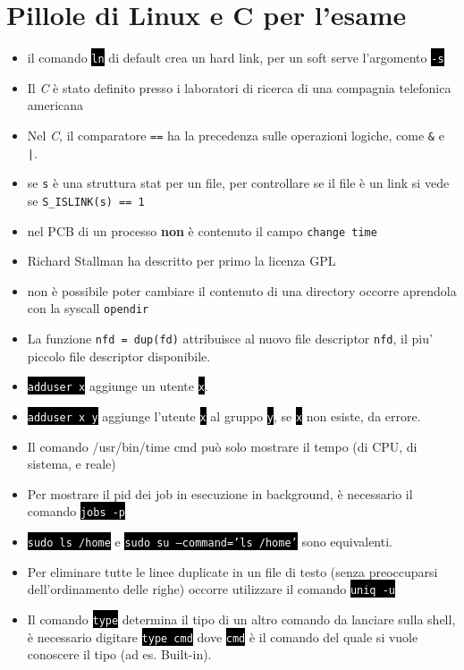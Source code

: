 \documentclass[12pt, letterpaper]{article}
\newcommand{\code}[1]{\colorbox{light-gray}{\texttt{#1}}}
\newcommand{\shelll}[1]{\colorbox{black}{\textcolor{white}{\texttt{#1}}}}
\newcommand{\codee}[1]{\colorbox{white}{\texttt{#1}}}
\begin{document}
\section{Pillole di Linux e C per l'esame}
\begin{itemize}
    \item il comando \shelll{ln} di default crea un hard link, per un soft serve l'argomento \shelll{-s}
    \item Il \textit{C} è stato definito  presso i laboratori di ricerca di una compagnia telefonica americana
    \item Nel \textit{C}, il comparatore \code{==} ha la precedenza sulle operazioni logiche, come \code{\&} e \code{|}.
    \item se \code{s} è una struttura stat per un file, per controllare se il file  è un link si vede se \code{S\_ISLINK(s) == 1}
    \item nel PCB di un processo \textbf{non} è contenuto il campo \codee{change time}  
    \item Richard Stallman ha descritto per primo la licenza GPL
    \item non è possibile poter cambiare il contenuto di una directory occorre aprendola con la syscall \code{opendir} 
    \item La funzione \code{nfd = dup(fd)} attribuisce al nuovo file descriptor \code{nfd}, il piu' piccolo file descriptor disponibile.
    \item  \shelll{adduser x} aggiunge un utente \shelll{x}.
    \item \shelll{adduser x y} aggiunge l'utente \shelll{x} al gruppo \shelll{y}, se \shelll{x} non esiste, da errore.
    \item Il comando /usr/bin/time cmd può solo mostrare il tempo (di CPU, di sistema, e reale)
    \item Per mostrare il pid dei job in esecuzione in background, è necessario il comando \shelll{jobs -p}
    \item \shelll{sudo ls  /home} e \shelll{sudo su --command='ls /home'} sono equivalenti.
    \item Per eliminare tutte le linee duplicate in un file di testo (senza preoccuparsi dell'ordinamento delle righe) occorre
    utilizzare il comando \shelll{uniq -u}
    \item Il comando \shelll{type} determina il tipo di un altro comando da lanciare sulla shell, è necessario digitare \shelll{type cmd}
    dove \shelll{cmd} è il comando del quale si vuole conoscere il tipo (ad es. Built-in).

\end{itemize}
\end{document}
